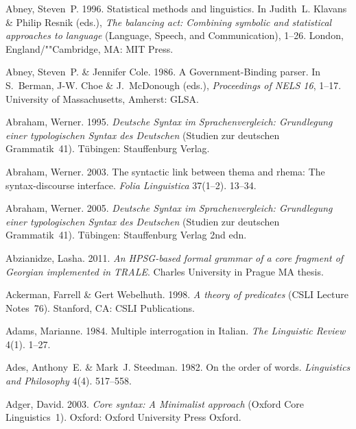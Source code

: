\begin{thebibliography}{1420}
Abney, Steven~P. 1996.
\newblock Statistical methods and linguistics.
\newblock In Judith~L. Klavans \& Philip Resnik (eds.), \emph{The balancing
  act: Combining symbolic and statistical approaches to language}  (Language,
  Speech, and Communication), 1--26. London, England/""Cambridge, MA: MIT
  Press.

Abney, Steven~P. \& Jennifer Cole. 1986.
\newblock A {Government-Binding} parser.
\newblock In S.~Berman, J-W. Choe \& J.~McDonough (eds.), \emph{Proceedings of
  {NELS 16}}, 1--17. University of Massachusetts, Amherst: GLSA.

Abraham, Werner. 1995.
\newblock \emph{{Deutsche Syntax im Sprachenvergleich: Grundlegung einer
  typologischen Syntax des Deutschen}} (Studien zur deutschen Grammatik~41).
\newblock T{\"u}bingen: Stauffenburg Verlag.

Abraham, Werner. 2003.
\newblock The syntactic link between thema and rhema: {The} syntax-discourse
  interface.
\newblock \emph{Folia Linguistica} 37(1--2). 13--34.

Abraham, Werner. 2005.
\newblock \emph{{Deutsche Syntax im Sprachenvergleich: Grundlegung einer
  typologischen Syntax des Deutschen}} (Studien zur deutschen Grammatik~41).
\newblock T{\"u}bingen: Stauffenburg Verlag 2nd edn.

Abzianidze, Lasha. 2011.
\newblock \emph{An {HPSG-based} formal grammar of a core fragment of {Georgian}
  implemented in {TRALE}}.
\newblock Charles University in Prague MA thesis.

Ackerman, Farrell \& Gert Webelhuth. 1998.
\newblock \emph{A theory of predicates} (CSLI Lecture Notes~76).
\newblock Stanford, CA: CSLI Publications.

Adams, Marianne. 1984.
\newblock Multiple interrogation in {Italian}.
\newblock \emph{The Linguistic Review} 4(1). 1--27.

Ades, Anthony~E. \& Mark~J. Steedman. 1982.
\newblock On the order of words.
\newblock \emph{Linguistics and Philosophy} 4(4). 517--558.

Adger, David. 2003.
\newblock \emph{Core syntax: {A Minimalist} approach} (Oxford Core
  Linguistics~1).
\newblock Oxford: Oxford University Press Oxford.


\end{thebibliography}
